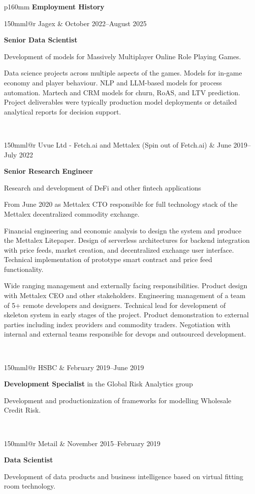 \documentclass[10pt,a4paper]{article}
\makeatletter
\newcommand{\role}[6]{
\begin{tabular*}{150mm}{l@{\extracolsep{\fill}}r}
#5 & #1--#2 \\ 
\multicolumn{2}{p{145mm}}
{\textbf{#3}#4

{\small #6}} 
\end{tabular*}
\vspace{2mm}
 }
\makeatother
\begin{document}
\begin{tabular}{p{160mm}}
  {\large \textbf{Employment History}}\\
  \hline
  \role{October 2022}{August 2025}{Senior Data Scientist}{}{Jagex}
  {Development of models for Massively Multiplayer Online Role Playing Games.

  \footnotesize{Data science projects across multiple aspects of the games.
 Models for in-game economy and player behaviour.  NLP and LLM-based models for
  process automation.  Martech and CRM models for churn, RoAS, and LTV prediction.
  Project deliverables were typically production model deployments or detailed analytical reports for
  decision support.
  }
  }\\
  \role{June 2019}{July 2022}{Senior Research Engineer}{}{Uvue Ltd - Fetch.ai and Mettalex (Spin out of Fetch.ai)}
  {Research and development of DeFi and other fintech applications

  \footnotesize{From June 2020 as Mettalex CTO responsible for full technology stack of the Mettalex decentralized commodity exchange.

  Financial engineering and economic analysis to design the system and produce the Mettalex Litepaper.
  Design of serverless architectures for backend integration with price feeds, market creation, and decentralized exchange
  user interface.  Technical implementation of prototype smart contract and price feed functionality.}

  \footnotesize{Wide ranging management and externally facing responsibilities.  Product design with Mettalex CEO
  and other stakeholders.  Engineering management of a team of 5+ remote developers and designers.
  Technical lead for development of skeleton
  system in early stages of the project.  Product demonstration to external parties including index providers and
  commodity traders.  Negotiation with internal and external teams responsible for devops and outsourced development.}
  }\\
  \role{February 2019}{June 2019}{Development Specialist}{ in the Global Risk Analytics group}{HSBC}
  {Development and productionization of frameworks for modelling Wholesale Credit Risk.
  }\\
  \role{November 2015}{February 2019}{Data Scientist}{}{Metail} 
  {Development of data products and business intelligence based on virtual fitting room technology.

}
\end{tabular}
\end{document}
